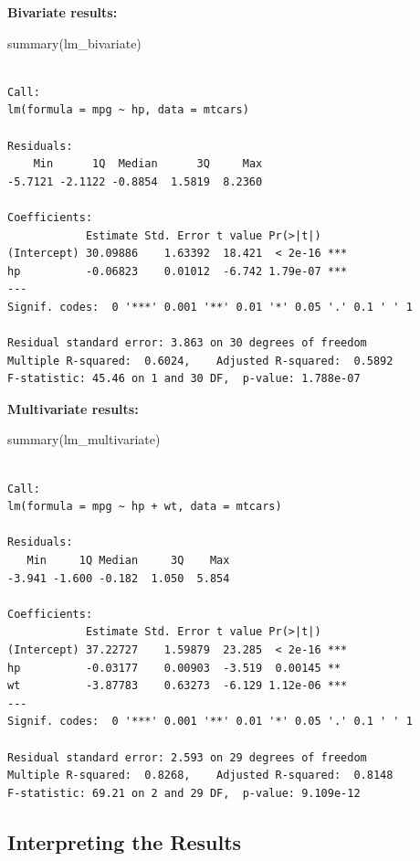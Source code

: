 \documentclass[
  letterpaper,
  DIV=11,
  numbers=noendperiod]{scrreprt}
\newenvironment{Shaded}{\begin{snugshade}}{\end{snugshade}}
\newcommand{\FunctionTok}[1]{\textcolor[rgb]{0.28,0.35,0.67}{#1}}
\newcommand{\NormalTok}[1]{\textcolor[rgb]{0.00,0.23,0.31}{#1}}
\begin{document}
\textbf{Bivariate results:}

\begin{Shaded}
\begin{Highlighting}[]
\FunctionTok{summary}\NormalTok{(lm\_bivariate)}
\end{Highlighting}
\end{Shaded}

\begin{verbatim}

Call:
lm(formula = mpg ~ hp, data = mtcars)

Residuals:
    Min      1Q  Median      3Q     Max 
-5.7121 -2.1122 -0.8854  1.5819  8.2360 

Coefficients:
            Estimate Std. Error t value Pr(>|t|)    
(Intercept) 30.09886    1.63392  18.421  < 2e-16 ***
hp          -0.06823    0.01012  -6.742 1.79e-07 ***
---
Signif. codes:  0 '***' 0.001 '**' 0.01 '*' 0.05 '.' 0.1 ' ' 1

Residual standard error: 3.863 on 30 degrees of freedom
Multiple R-squared:  0.6024,    Adjusted R-squared:  0.5892 
F-statistic: 45.46 on 1 and 30 DF,  p-value: 1.788e-07
\end{verbatim}

\textbf{Multivariate results:}

\begin{Shaded}
\begin{Highlighting}[]
\FunctionTok{summary}\NormalTok{(lm\_multivariate)}
\end{Highlighting}
\end{Shaded}

\begin{verbatim}

Call:
lm(formula = mpg ~ hp + wt, data = mtcars)

Residuals:
   Min     1Q Median     3Q    Max 
-3.941 -1.600 -0.182  1.050  5.854 

Coefficients:
            Estimate Std. Error t value Pr(>|t|)    
(Intercept) 37.22727    1.59879  23.285  < 2e-16 ***
hp          -0.03177    0.00903  -3.519  0.00145 ** 
wt          -3.87783    0.63273  -6.129 1.12e-06 ***
---
Signif. codes:  0 '***' 0.001 '**' 0.01 '*' 0.05 '.' 0.1 ' ' 1

Residual standard error: 2.593 on 29 degrees of freedom
Multiple R-squared:  0.8268,    Adjusted R-squared:  0.8148 
F-statistic: 69.21 on 2 and 29 DF,  p-value: 9.109e-12
\end{verbatim}

\subsection{Interpreting the Results}\label{interpreting-the-results}
\end{document}
